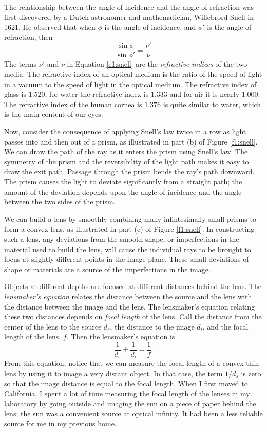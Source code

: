 The relationship between the angle of incidence
and the angle of refraction was first discovered by
a Dutch astronomer and mathematician, Willebrord Snell
in 1621.
He observed that when
$\phi$ is the angle of incidence, and
$\phi '$ is the angle of refraction, then
\begin{equation}
\label{e1:snell}
\frac{ \sin \phi } { \sin \phi ' } = \frac{\nu '}{\nu }
\end{equation}
The terms $\nu '$ and $\nu$ in Equation \ref{e1:snell}
are the {\em refractive indices} of the two media.
The refractive index of an optical medium
is the ratio of the speed of light in a
vacuum to the speed of light in the optical medium.
The refractive index of glass is $1.520$, for water
the refractive index is $1.333$ and for air it is 
nearly $1.000$.
The refractive index of the human cornea is $1.376$ is quite
similar to water, which is the main content of our eyes.

Now, consider the consequence of applying Snell's
law twice in a row as light passes into and then
out of a prism, as illustrated in part (b) of Figure \ref{f1:snell}.
We can draw the path of the ray as it enters the prism
using Snell's law.
The symmetry of the prism and the reversibility of the
light path makes it easy to draw the exit path.
Passage through the prism bends the ray's path downward.
The prism causes the light to deviate significantly
from a straight path; the amount of the deviation
depends upon the angle of incidence and
the angle between the two sides of the prism.

We can build a lens by smoothly
combining many infintesimally
small prisms to form a convex lens,
as illustrated in part (c) of Figure \ref{f1:snell}.
In constructing such a lens,
any deviations from the smooth shape, or imperfections
in the material used to build the lens,
will cause the individual rays
to be brought to focus at slightly different
points in the image plane.
These small deviations of shape or materials
are a source of the imperfections in the image.

Objects at different depths 
are focused at different distances behind the lens.
The {\em lensmaker's equation} relates the 
distance between the source and the lens
with the distance between the image and the lens.
The lensmaker's equation relating these two distances depends on
{\em focal length} of the lens.
Call the distance from the center of the lens
to the source $d_s$, the distance
to the image $d_i$, and the focal length of the lens, $f$.
Then the lensmaker's equation is
\begin{equation}
\frac{1}{{d_s}} + \frac{1}{{d_i}} = \frac{1}{ f} .
\end{equation}
From this equation,
notice that we can measure the focal length of a convex thin lens
by using it to image a very distant object.
In that case, the term $1/{d_s}$ is zero so that the image distance
is equal to the focal length.
When I first moved to California, I spent a lot of time
measuring the focal length of the lenses in my laboratory
by going outside and imaging the sun on a piece of paper behind the lens;
the sun was a convenient source at optical infinity.
It had been a less reliable source for me in my previous home.

